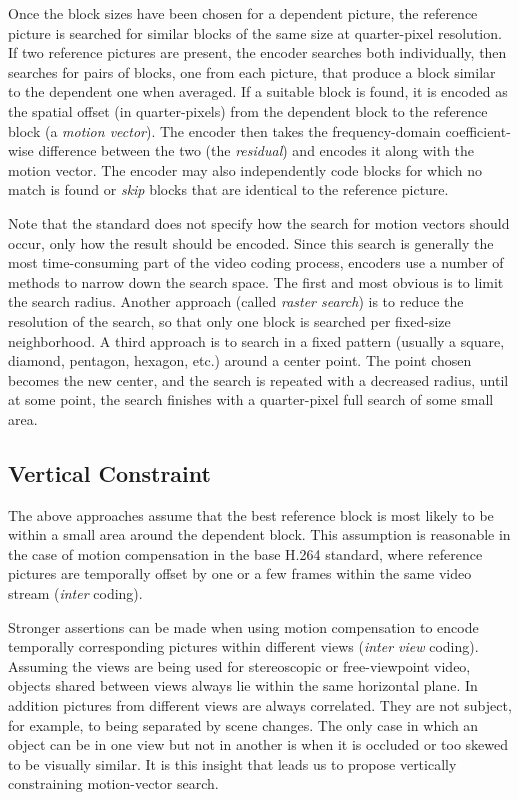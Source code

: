 \documentclass{sig-alternate-05-2015}
\begin{document}
Once the block sizes have been chosen for a dependent picture, the reference
picture is searched for similar blocks of the same size at quarter-pixel
resolution. If two reference pictures are present, the encoder searches both
individually, then searches for pairs of blocks, one from each picture, that
produce a block similar to the dependent one when averaged. If a suitable block
is found, it is encoded as the spatial offset (in quarter-pixels) from the
dependent block to the reference block (a {\it motion vector}). The encoder then
takes the frequency-domain coefficient-wise difference between the two (the
{\it residual}) and encodes it along with the motion vector. The encoder may
also independently code blocks for which no match is found or {\it skip} blocks
that are identical to the reference picture.

Note that the standard does not specify how the search for motion vectors should
occur, only how the result should be encoded. Since this search is generally the
most time-consuming part of the video coding process, encoders use a number of
methods to narrow down the search space. The first and most obvious is to limit
the search radius. Another approach (called {\it raster search}) is to reduce
the resolution of the search, so that only one block is searched per fixed-size
neighborhood. A third approach is to search in a fixed pattern (usually a
square, diamond, pentagon, hexagon, etc.) around a center point. The point
chosen becomes the new center, and the search is repeated with a decreased
radius, until at some point, the search finishes with a quarter-pixel full
search of some small area.

\subsection{Vertical Constraint} %
\label{subsec:constraining} %

The above approaches assume that the best reference block is most likely to be
within a small area around the dependent block. This assumption is reasonable
in the case of motion compensation in the base H.264 standard, where reference
pictures are temporally offset by one or a few frames within the same video
stream ({\it inter} coding).

Stronger assertions can be made when using motion compensation to encode
temporally corresponding pictures within different views ({\it inter view}
coding). Assuming the views are being used for stereoscopic or free-viewpoint
video, objects shared between views always lie within the same horizontal plane.
In addition pictures from different views are always correlated. They are not
subject, for example, to being separated by scene changes. The only case in
which an object can be in one view but not in another is when it is occluded or
too skewed to be visually similar. It is this insight that leads us to propose
vertically constraining motion-vector search.
\end{document}
